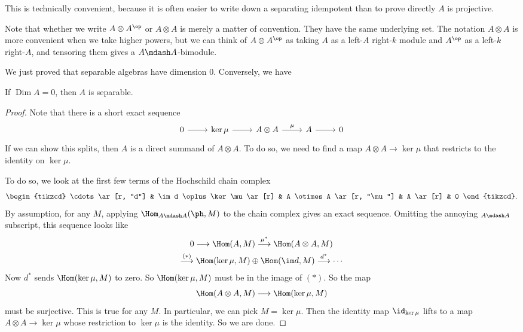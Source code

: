 \documentclass[a4paper]{article}
\DeclareMathOperator\Dim{Dim}
\begin{document}
This is technically convenient, because it is often easier to write down a separating idempotent than to prove directly $A$ is projective.

Note that whether we write $A \otimes A^\op$ or $A \otimes A$ is merely a matter of convention. They have the same underlying set. The notation $A \otimes A$ is more convenient when we take higher powers, but we can think of $A \otimes A^\op$ as taking $A$ as a left-$A$ right-$k$ module and $A^\op$ as a left-$k$ right-$A$, and tensoring them gives a $A\mdash A$-bimodule.

We just proved that separable algebras have dimension $0$. Conversely, we have
\begin{lemma}
  If $\Dim A = 0$, then $A$ is separable.
\end{lemma}

\begin{proof}
  Note that there is a short exact sequence
  \[
    \begin{tikzcd}
      0 \ar[r] & \ker \mu \ar[r] & A \otimes A \ar[r, "\mu"] & A \ar[r] & 0
    \end{tikzcd}
  \]
  If we can show this splits, then $A$ is a direct summand of $A \otimes A$. To do so, we need to find a map $A \otimes A \to \ker \mu$ that restricts to the identity on $\ker \mu$.

  To do so, we look at the first few terms of the Hochschild chain complex
  \[
    \begin{tikzcd}
      \cdots \ar[r, "d"] & \im d \oplus \ker \mu \ar[r] & A \otimes A \ar[r, "\mu"] & A \ar[r] & 0
    \end{tikzcd}.
  \]
  By assumption, for any $M$, applying $\Hom_{A\mdash A} (\ph, M)$ to the chain complex gives an exact sequence. Omitting the annoying $_{A \mdash A}$ subscript, this sequence looks like
  \begin{multline*}
    0 \longrightarrow \Hom(A, M) \overset{\mu^*}{\longrightarrow} \Hom(A \otimes A, M)\\
    \overset{(*)}{\longrightarrow} \Hom(\ker \mu, M) \oplus \Hom(\im d, M) \overset{d^*}{\longrightarrow} \cdots
  \end{multline*}
  Now $d^*$ sends $\Hom(\ker \mu, M)$ to zero. So $\Hom(\ker \mu, M)$ must be in the image of $(*)$. So the map
  \[
    \Hom(A \otimes A, M) \longrightarrow \Hom(\ker \mu, M)
  \]
  must be surjective. This is true for any $M$. In particular, we can pick $M = \ker \mu$. Then the identity map $\id_{\ker \mu}$ lifts to a map $A \otimes A \to \ker \mu$ whose restriction to $\ker \mu$ is the identity. So we are done.
\end{proof}
\end{document}
